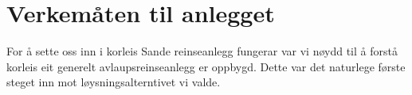 \chapter{Verkemåten til anlegget}\label{sec:6}
\thispagestyle{fancy}

For å sette oss inn i korleis Sande reinseanlegg fungerar var vi nøydd til å forstå
korleis eit generelt avlaupsreinseanlegg er oppbygd. Dette var det naturlege første
steget inn mot løysningsalterntivet vi valde. 


